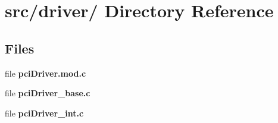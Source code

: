 \hypertarget{dir_000003}{
\section{src/driver/ Directory Reference}
\label{dir_000003}
}
\subsection*{Files}
\begin{CompactItemize}
\item 
file {\bf pci\-Driver.mod.c}
\item 
file {\bf pci\-Driver\_\-base.c}
\item 
file {\bf pci\-Driver\_\-int.c}
\end{CompactItemize}
